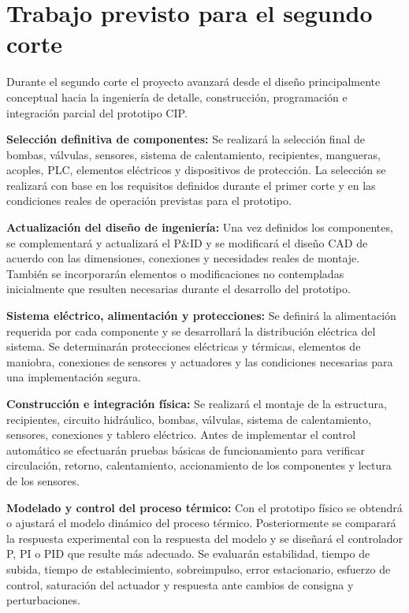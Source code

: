 \section{Trabajo previsto para el segundo corte}
\noindent Durante el segundo corte el proyecto avanzará desde el diseño principalmente conceptual hacia la ingeniería de detalle, construcción, programación e integración parcial del prototipo CIP.
\par\medskip
\noindent\textbf{Selección definitiva de componentes:} Se realizará la selección final de bombas, válvulas, sensores, sistema de calentamiento, recipientes, mangueras, acoples, PLC, elementos eléctricos y dispositivos de protección. La selección se realizará con base en los requisitos definidos durante el primer corte y en las condiciones reales de operación previstas para el prototipo.
\par\medskip
\noindent\textbf{Actualización del diseño de ingeniería:} Una vez definidos los componentes, se complementará y actualizará el P\&ID y se modificará el diseño CAD de acuerdo con las dimensiones, conexiones y necesidades reales de montaje. También se incorporarán elementos o modificaciones no contempladas inicialmente que resulten necesarias durante el desarrollo del prototipo.
\par\medskip
\noindent\textbf{Sistema eléctrico, alimentación y protecciones:} Se definirá la alimentación requerida por cada componente y se desarrollará la distribución eléctrica del sistema. Se determinarán protecciones eléctricas y térmicas, elementos de maniobra, conexiones de sensores y actuadores y las condiciones necesarias para una implementación segura.
\par\medskip
\noindent\textbf{Construcción e integración física:} Se realizará el montaje de la estructura, recipientes, circuito hidráulico, bombas, válvulas, sistema de calentamiento, sensores, conexiones y tablero eléctrico. Antes de implementar el control automático se efectuarán pruebas básicas de funcionamiento para verificar circulación, retorno, calentamiento, accionamiento de los componentes y lectura de los sensores.
\par\medskip
\noindent\textbf{Modelado y control del proceso térmico:} Con el prototipo físico se obtendrá o ajustará el modelo dinámico del proceso térmico. Posteriormente se comparará la respuesta experimental con la respuesta del modelo y se diseñará el controlador P, PI o PID que resulte más adecuado. Se evaluarán estabilidad, tiempo de subida, tiempo de establecimiento, sobreimpulso, error estacionario, esfuerzo de control, saturación del actuador y respuesta ante cambios de consigna y perturbaciones.
